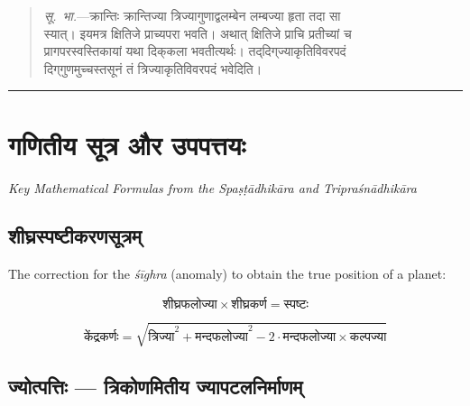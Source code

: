 \documentclass[11pt,a4paper]{article}
\newcommand{\longline}{\noindent\rule{\textwidth}{0.4pt}}
\newcommand{\dev}[1]{{\devanagarifont #1}}
\newenvironment{vyakhya}{%
  \begin{quote}
  \small
  \setlength{\leftmargin}{1em}
  \devanagarifont
}{\end{quote}}
\newcommand{\skt}[1]{{\devanagarifont #1}}
\begin{document}
\begin{vyakhya}
\textit{सू.\ भा.}—\skt{क्रान्तिः क्रान्तिज्या त्रिज्यागुणाद्वलम्बेन लम्बज्या हृता तदा सा}\\
\skt{स्यात्। इयमत्र क्षितिजे प्राच्यपरा भवति। अथात् क्षितिजे प्राचि प्रतीच्यां च}\\
\skt{प्रागपरस्वस्तिकायां यथा दिक्‌कला भवतीत्यर्थः। तद्‌दिग्‌ज्याकृतिविवरपदं}\\
\skt{दिग्‌गुणमुच्चस्तसूनं तं त्रिज्याकृतिविवरपदं भवेदिति।}
\end{vyakhya}

\longline

\section{\dev{गणितीय सूत्र और उपपत्तयः}}

\begin{center}
\textit{Key Mathematical Formulas from the Spaṣṭādhikāra and Tripraśnādhikāra}
\end{center}

\subsection{\dev{शीघ्रस्पष्टीकरणसूत्रम्}}

The correction for the \textit{śīghra} (anomaly) to obtain the true position of a planet:

\begin{equation}
\text{शीघ्रफलोज्या} \times \text{शीघ्रकर्ण} = \text{स्पष्टः}
\end{equation}

\begin{equation}
\text{केंद्रकर्णः} = \sqrt{\text{त्रिज्या}^2 + \text{मन्दफलोज्या}^2 - 2 \cdot \text{मन्दफलोज्या} \times \text{कल्पज्या}}
\end{equation}

\subsection{\dev{ज्योत्पत्तिः — त्रिकोणमितीय ज्यापटलनिर्माणम्}}
\end{document}
